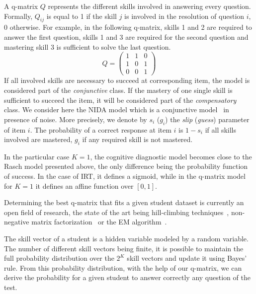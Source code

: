 \documentclass{edm_template}
\begin{document}
A q-matrix $Q$ \cite{Tatsuoka1983} represents the different skills involved in answering every question. Formally, $Q_{ij}$ is equal to 1 if the skill $j$ is involved in the resolution of question $i$, 0 otherwise. For example, in the following q-matrix, skills 1 and 2 are required to answer the first question, skills 1 and 3 are required for the second question and mastering skill 3 is sufficient to solve the last question.
\[ Q = \left(\begin{array}{lll}
1 & 1 & 0\\
1 & 0 & 1\\
0 & 0 & 1
\end{array}\right) \]
If all involved skills are necessary to succeed at corresponding item, the model is considered part of the \emph{conjunctive} class. 
If the mastery of one single skill is sufficient to succeed the item, it will be considered part of the \emph{compensatory} class. We consider here the NIDA model which is a conjunctive model~\cite{Desmarais2012} in presence of noise. More precisely, we denote by $s_i$ ($g_i$) the \emph{slip} (\emph{guess}) parameter of item $i$. The probability of a correct response at item $i$ is $1 - s_i$ if all skills involved are mastered, $g_i$ if any required skill is not mastered.

In the particular case $K=1$, the cognitive diagnostic model becomes close to the Rasch model presented above, the only difference being the probability function of success. In the case of IRT, it defines a sigmoid, while in the q-matrix model for $K = 1$ it defines an affine function over $[0,1]$.

Determining the best q-matrix that fits a given student dataset is currently an open field of research, the state of the art being hill-climbing techniques~\cite{Barnes2005}, non-negative matrix factorization~\cite{Desmarais2011} or the EM algorithm~\cite{Huebner2010}. 

The skill vector of a student is a hidden variable modeled by a random variable. The number of different skill vectors being finite, it is possible to maintain the full probability distribution over the $2^K$ skill vectors and update it using Bayes' rule. From this probability distribution, with the help of our q-matrix, we can derive the probability for a given student to answer correctly any question of the test.

\end{document}

